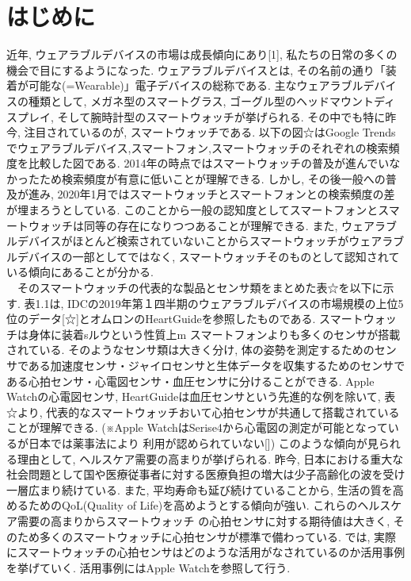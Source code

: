 \documentclass[report, 11pt, a4paper]{jsbook}
\begin{document}
\section{はじめに}
近年, ウェアラブルデバイスの市場は成長傾向にあり[1], 私たちの日常の多くの機会で目にするようになった. ウェアラブルデバイスとは,  その名前の通り「装着が可能な(=Wearable)」電子デバイスの総称である. 主なウェアラブルデバイスの種類として, メガネ型のスマートグラス, ゴーグル型のヘッドマウントディスプレイ, そして腕時計型のスマートウォッチが挙げられる. その中でも特に昨今, 注目されているのが, スマートウォッチである. 以下の図☆はGoogle Trendsでウェアラブルデバイス,スマートフォン,スマートウォッチのそれぞれの検索頻度を比較した図である. 2014年の時点ではスマートウォッチの普及が進んでいなかったため検索頻度が有意に低いことが理解できる. しかし, その後一般への普及が進み, 2020年1月ではスマートウォッチとスマートフォンとの検索頻度の差が埋まろうとしている. このことから一般の認知度としてスマートフォンとスマートウォッチは同等の存在になりつつあることが理解できる. また, ウェアラブルデバイスがほとんど検索されていないことからスマートウォッチがウェアラブルデバイスの一部としてではなく, スマートウォッチそのものとして認知されている傾向にあることが分かる.\\
　そのスマートウォッチの代表的な製品とセンサ類をまとめた表☆を以下に示す. 表1.1は, IDCの2019年第１四半期のウェアラブルデバイスの市場規模の上位5位のデータ[☆]とオムロンのHeartGuideを参照したものである. スマートウォッチは身体に装着sルウという性質上m スマートフォンよりも多くのセンサが搭載されている. そのようなセンサ類は大きく分け, 体の姿勢を測定するためのセンサである加速度センサ・ジャイロセンサと生体データを収集するためのセンサである心拍センサ・心電図センサ・血圧センサに分けることができる. Apple Watchの心電図センサ, HeartGuideは血圧センサという先進的な例を除いて, 表☆より, 代表的なスマートウォッチおいて心拍センサが共通して搭載されていることが理解できる. (※Apple WatchはSerise4から心電図の測定が可能となっているが日本では薬事法により
利用が認められていない[]) このような傾向が見られる理由として, ヘルスケア需要の高まりが挙げられる. 昨今, 日本における重大な社会問題として国や医療従事者に対する医療負担の増大は少子高齢化の波を受け一層広まり続けている. また, 平均寿命も延び続けていることから, 生活の質を高めるためのQoL(Quality of Life)を高めようとする傾向が強い. これらのヘルスケア需要の高まりからスマートウォッチ の心拍センサに対する期待値は大きく, そのため多くのスマートウォッチに心拍センサが標準で備わっている. では, 実際にスマートウォッチの心拍センサはどのような活用がなされているのか活用事例を挙げていく. 活用事例にはApple Watchを参照して行う.\\
\end{document}

